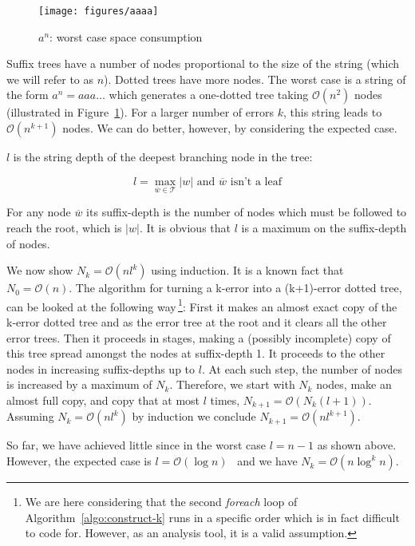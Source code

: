 \begin{figure}
\centering
\texttt{[image: figures/aaaa]}
\caption{$a^n$: worst case space consumption}%
\label{fig:aaaa}
\end{figure}

Suffix trees have a number of nodes proportional to the size of the string (which we will refer to as $n$). Dotted trees have more nodes. The worst case is a string of the form $a^n = aaa\dots$ which generates a one-dotted tree taking $\mathcal{O}(n^2)$ nodes (illustrated in Figure~\ref{fig:aaaa}). For a larger number of errors $k$, this string leads to $\mathcal{O}(n^{k+1})$ nodes. We can do better, however, by considering the expected case.

\begin{definition}
$l$ is the string depth of the deepest branching node in the tree:

\[ l = \max_{\overline{w} \in \mathcal{T}} |w| \mbox{ and $\overline{w}$ isn't a leaf} \]
\end{definition}

\begin{definition}
For any node $\overline{w}$ its suffix-depth is the number of nodes which must be followed to reach the root, which is $|w|$. It is obvious that $l$ is a maximum on the suffix-depth of nodes.
\end{definition}

We now show $N_k = \mathcal{O}(nl^k)$ using induction. It is a known fact that $N_0 = \mathcal{O}(n)$. The algorithm for turning a k-error into a (k+1)-error dotted tree, can be looked at the following way\,\footnote{We are here considering that the second \textit{foreach} loop of Algorithm~\ref{algo:construct-k} runs in a specific order which is in fact difficult to code for. However, as an analysis tool, it is a valid assumption.}: First it makes an almost exact copy of the k-error dotted tree and as the error tree at the root and it clears all the other error trees. Then it proceeds in stages, making a (possibly incomplete) copy of this tree spread amongst the nodes at suffix-depth 1. It proceeds to the other nodes in increasing suffix-depths up to $l$. At each such step, the number of nodes is increased by a maximum of $N_k$. Therefore, we start with $N_k$ nodes, make an almost full copy, and copy that at most $l$ times, $N_{k+1}=\mathcal{O}(N_k(l+1))$. Assuming $N_k=\mathcal{O}(nl^k)$ by induction we conclude $N_{k+1}=\mathcal{O}(nl^{k+1})$.

So far, we have achieved little since in the worst case $l=n-1$ as shown above. However, the expected case is $l=\mathcal{O}(\log n)$~\cite{apostolico92selfalignments,szpankowski:unexpected} and we have $N_k=\mathcal{O}(n\log^k n)$.
